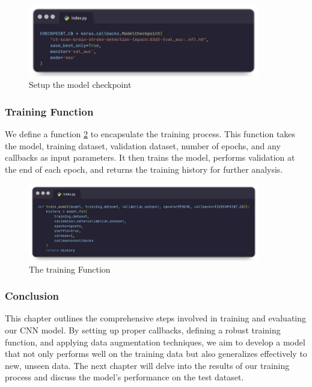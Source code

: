 \begin{figure}
 \centering
    \includegraphics[width=0.90\textwidth]{Img/Chap-01/35.jpg}
    \caption{Setup the model checkpoint}
    \label{fig:brain_model_checkpoint}
\end{figure}

\subsubsection{Training Function}

We define a function \ref{fig:brain_strock_train} to encapsulate the training process. This function takes the model, training dataset, validation dataset, number of epochs, and any callbacks as input parameters. It then trains the model, performs validation at the end of each epoch, and returns the training history for further analysis.

\begin{figure}
 \centering
    \includegraphics[width=0.90\textwidth]{Img/Chap-01/36.jpg}
    \caption{The training Function }
    \label{fig:brain_strock_train}
\end{figure}

\subsubsection{Conclusion}
This chapter outlines the comprehensive steps involved in training and evaluating our CNN model. By setting up proper callbacks, defining a robust training function, and applying data augmentation techniques, we aim to develop a model that not only performs well on the training data but also generalizes effectively to new, unseen data. The next chapter will delve into the results of our training process and discuss the model's performance on the test dataset.

